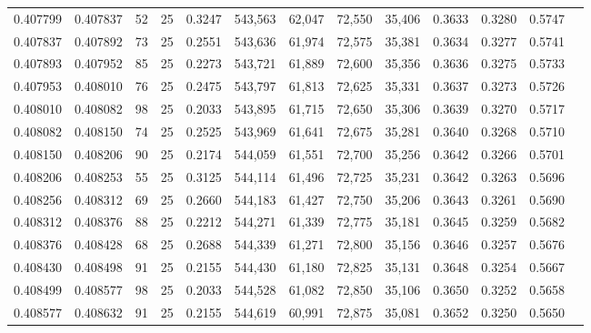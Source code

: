 \begin{tabular}{rrrrrrrrrrrrr}
0.407799 & 0.407837 &    52 &  25 &                                     0.3247 & 543,563 &  62,047 &  72,550 &  35,406 & 0.3633 & 0.3280 & 0.5747 \\
0.407837 & 0.407892 &    73 &  25 &                                     0.2551 & 543,636 &  61,974 &  72,575 &  35,381 & 0.3634 & 0.3277 & 0.5741 \\
0.407893 & 0.407952 &    85 &  25 &                                     0.2273 & 543,721 &  61,889 &  72,600 &  35,356 & 0.3636 & 0.3275 & 0.5733 \\
0.407953 & 0.408010 &    76 &  25 &                                     0.2475 & 543,797 &  61,813 &  72,625 &  35,331 & 0.3637 & 0.3273 & 0.5726 \\
0.408010 & 0.408082 &    98 &  25 &                                     0.2033 & 543,895 &  61,715 &  72,650 &  35,306 & 0.3639 & 0.3270 & 0.5717 \\
0.408082 & 0.408150 &    74 &  25 &                                     0.2525 & 543,969 &  61,641 &  72,675 &  35,281 & 0.3640 & 0.3268 & 0.5710 \\
0.408150 & 0.408206 &    90 &  25 &                                     0.2174 & 544,059 &  61,551 &  72,700 &  35,256 & 0.3642 & 0.3266 & 0.5701 \\
0.408206 & 0.408253 &    55 &  25 &                                     0.3125 & 544,114 &  61,496 &  72,725 &  35,231 & 0.3642 & 0.3263 & 0.5696 \\
0.408256 & 0.408312 &    69 &  25 &                                     0.2660 & 544,183 &  61,427 &  72,750 &  35,206 & 0.3643 & 0.3261 & 0.5690 \\
0.408312 & 0.408376 &    88 &  25 &                                     0.2212 & 544,271 &  61,339 &  72,775 &  35,181 & 0.3645 & 0.3259 & 0.5682 \\
0.408376 & 0.408428 &    68 &  25 &                                     0.2688 & 544,339 &  61,271 &  72,800 &  35,156 & 0.3646 & 0.3257 & 0.5676 \\
0.408430 & 0.408498 &    91 &  25 &                                     0.2155 & 544,430 &  61,180 &  72,825 &  35,131 & 0.3648 & 0.3254 & 0.5667 \\
0.408499 & 0.408577 &    98 &  25 &                                     0.2033 & 544,528 &  61,082 &  72,850 &  35,106 & 0.3650 & 0.3252 & 0.5658 \\
0.408577 & 0.408632 &    91 &  25 &                                     0.2155 & 544,619 &  60,991 &  72,875 &  35,081 & 0.3652 & 0.3250 & 0.5650 \\

\end{tabular}
